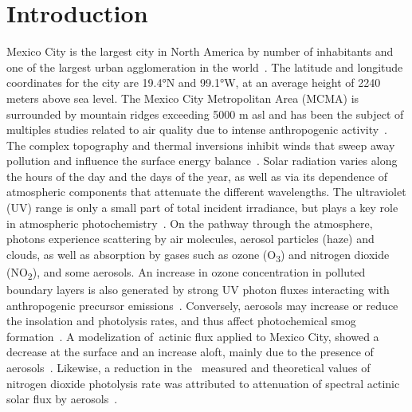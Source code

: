 \documentclass{article}
\begin{document}
\section*{Introduction}

Mexico City is the largest city in North America by number of
inhabitants and one of the largest urban agglomeration in the
world~\cite{2014a}. The latitude and longitude coordinates for the
city are 19.4°N and 99.1°W, at an average height of 2240 meters above
sea level. The Mexico City Metropolitan Area (MCMA) is surrounded by
mountain ridges exceeding 5000 m asl and has been the subject of
multiples studies related to air quality due to intense anthropogenic
activity~\cite{coauthors1998,Molina_2007,Molina_2010,Tzompa_Sosa_2017}. The complex topography and thermal
inversions inhibit winds that sweep away pollution and influence the
surface energy balance~\cite{Whiteman_2000,juregui-ostos2005,Zhang_2009}. Solar radiation varies along
the hours of the day and the days of the year, as well as via its
dependence of atmospheric components that attenuate the different
wavelengths. The ultraviolet (UV) range is only a small part of total
incident irradiance, but plays a key role in atmospheric
photochemistry~\cite{LEIGHTON_1961,pandis2016}. On the pathway through the
atmosphere, photons experience scattering by air molecules, aerosol
particles (haze) and clouds, as well as absorption by gases such as
ozone (O\textsubscript{3}) and nitrogen dioxide (NO\textsubscript{2}),
and some aerosols. An increase in ozone concentration in polluted
boundary layers is also generated by strong UV photon fluxes interacting
with anthropogenic precursor emissions~\cite{LEIGHTON_1961,Finlayson_Pitts_2000}. Conversely,
aerosols may increase or reduce the insolation and photolysis rates, and
thus affect photochemical smog formation~\cite{Dickerson_1997}. A
modelization of~actinic flux applied to Mexico City, showed a decrease
at the surface and an increase aloft, mainly due to the presence of
aerosols~\cite{Palancar_2012}. Likewise, a reduction in the~ measured and
theoretical values of nitrogen dioxide photolysis rate was attributed to
attenuation of spectral actinic solar flux by
aerosols~\cite{Castro_2001}.~
\end{document}
